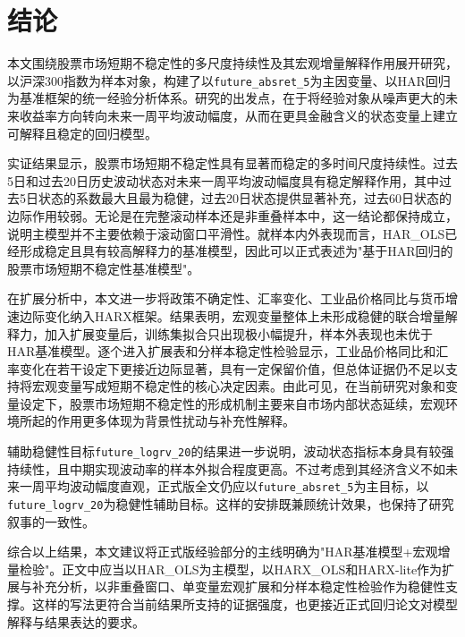 
\section{结论}

本文围绕股票市场短期不稳定性的多尺度持续性及其宏观增量解释作用展开研究，以沪深300指数为样本对象，构建了以\texttt{future\_absret\_5}为主因变量、以HAR回归为基准框架的统一经验分析体系。研究的出发点，在于将经验对象从噪声更大的未来收益率方向转向未来一周平均波动幅度，从而在更具金融含义的状态变量上建立可解释且稳定的回归模型。

实证结果显示，股票市场短期不稳定性具有显著而稳定的多时间尺度持续性。过去5日和过去20日历史波动状态对未来一周平均波动幅度具有稳定解释作用，其中过去5日状态的系数最大且最为稳健，过去20日状态提供显著补充，过去60日状态的边际作用较弱。无论是在完整滚动样本还是非重叠样本中，这一结论都保持成立，说明主模型并不主要依赖于滚动窗口平滑性。就样本内外表现而言，HAR\_OLS已经形成稳定且具有较高解释力的基准模型，因此可以正式表述为"基于HAR回归的股票市场短期不稳定性基准模型"。

在扩展分析中，本文进一步将政策不确定性、汇率变化、工业品价格同比与货币增速边际变化纳入HARX框架。结果表明，宏观变量整体上未形成稳健的联合增量解释力，加入扩展变量后，训练集拟合只出现极小幅提升，样本外表现也未优于HAR基准模型。逐个进入扩展表和分样本稳定性检验显示，工业品价格同比和汇率变化在若干设定下更接近边际显著，具有一定保留价值，但总体证据仍不足以支持将宏观变量写成短期不稳定性的核心决定因素。由此可见，在当前研究对象和变量设定下，股票市场短期不稳定性的形成机制主要来自市场内部状态延续，宏观环境所起的作用更多体现为背景性扰动与补充性解释。

辅助稳健性目标\texttt{future\_logrv\_20}的结果进一步说明，波动状态指标本身具有较强持续性，且中期实现波动率的样本外拟合程度更高。不过考虑到其经济含义不如未来一周平均波动幅度直观，正式版全文仍应以\texttt{future\_absret\_5}为主目标，以\texttt{future\_logrv\_20}为稳健性辅助目标。这样的安排既兼顾统计效果，也保持了研究叙事的一致性。

综合以上结果，本文建议将正式版经验部分的主线明确为"HAR基准模型+宏观增量检验"。正文中应当以HAR\_OLS为主模型，以HARX\_OLS和HARX-lite作为扩展与补充分析，以非重叠窗口、单变量宏观扩展和分样本稳定性检验作为稳健性支撑。这样的写法更符合当前结果所支持的证据强度，也更接近正式回归论文对模型解释与结果表达的要求。
